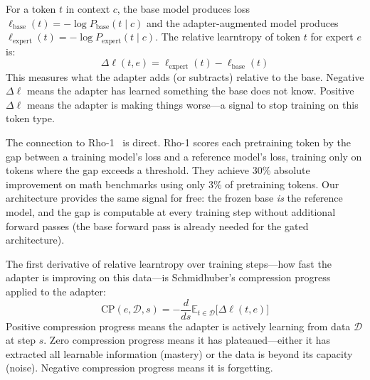 \documentclass{article}
\begin{document}
For a token $t$ in context $c$, the base model produces loss
$\ell_{\text{base}}(t) = -\log P_{\text{base}}(t \mid c)$ and the
adapter-augmented model produces
$\ell_{\text{expert}}(t) = -\log P_{\text{expert}}(t \mid c)$.
The relative learntropy of token $t$ for expert $e$ is:
\begin{equation}
\label{eq:relative-learntropy}
    \Delta\ell(t, e) = \ell_{\text{expert}}(t) - \ell_{\text{base}}(t)
\end{equation}
This measures what the adapter adds (or subtracts) relative to the
base. Negative $\Delta\ell$ means the adapter has learned something the
base does not know. Positive $\Delta\ell$ means the adapter is making
things worse---a signal to stop training on this token type.

The connection to Rho-1~\cite{rho1_2024} is direct. Rho-1 scores each
pretraining token by the gap between a training model's loss and a
reference model's loss, training only on tokens where the gap exceeds a
threshold. They achieve 30\% absolute improvement on math benchmarks
using only 3\% of pretraining tokens. Our architecture provides the same
signal for free: the frozen base \emph{is} the reference model, and the
gap is computable at every training step without additional forward
passes (the base forward pass is already needed for the gated
architecture).


The first derivative of relative learntropy over training steps---how
fast the adapter is improving on this data---is Schmidhuber's
compression progress applied to the adapter:
\begin{equation}
\label{eq:compression-progress}
    \text{CP}(e, \mathcal{D}, s) =
    -\frac{d}{ds} \mathbb{E}_{t \in \mathcal{D}}
    \bigl[\Delta\ell(t, e)\bigr]
\end{equation}
Positive compression progress means the adapter is actively learning
from data $\mathcal{D}$ at step $s$. Zero compression progress means it
has plateaued---either it has extracted all learnable information (mastery)
or the data is beyond its capacity (noise). Negative compression
progress means it is forgetting.

\end{document}
